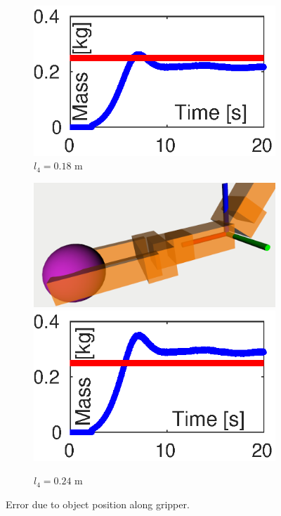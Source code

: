 \documentclass[conference,letterpaper]{ieeeconf}
\begin{document}
\begin{figure}
\begin{subfigure}{0.155\textwidth}
    \includegraphics[width=\textwidth]{Figures/obj_position3.eps}
    \caption{$l_4=0.18$ m}
    \label{fig:obj_position2}
  \end{subfigure}
  \begin{subfigure}{0.155\textwidth}
    \centering
    \includegraphics[width=\textwidth]{Figures/obj_position3.png}
    \includegraphics[width=\textwidth]{Figures/obj_position2.eps}
    \caption{$l_4=0.24$ m}
    \label{fig:obj_position3}
  \end{subfigure}
  \caption{Error due to object position along gripper.}
  \label{fig:ObjPosition}
\end{figure}
\end{document}
